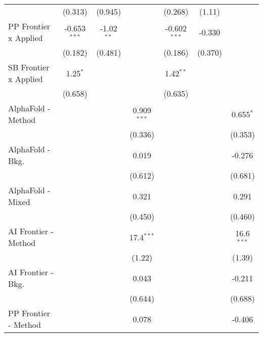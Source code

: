 \begin{tabular}{lcccccc}
                                  & (0.313)        & (0.945)       &               & (0.268)        & (1.11)        &   \\   
   PP Frontier x Applied          & -0.653$^{***}$ & -1.02$^{**}$  &               & -0.602$^{***}$ & -0.330        &   \\   
                                  & (0.182)        & (0.481)       &               & (0.186)        & (0.370)       &   \\   
   SB Frontier x Applied          & 1.25$^{*}$     &               &               & 1.42$^{**}$    &               &   \\   
                                  & (0.658)        &               &               & (0.635)        &               &   \\   
   AlphaFold - Method             &                &               & 0.909$^{***}$ &                &               & 0.655$^{*}$\\   
                                  &                &               & (0.336)       &                &               & (0.353)\\   
   AlphaFold - Bkg.               &                &               & 0.019         &                &               & -0.276\\   
                                  &                &               & (0.612)       &                &               & (0.681)\\   
   AlphaFold - Mixed              &                &               & 0.321         &                &               & 0.291\\   
                                  &                &               & (0.450)       &                &               & (0.460)\\   
   AI Frontier - Method           &                &               & 17.4$^{***}$  &                &               & 16.6$^{***}$\\   
                                  &                &               & (1.22)        &                &               & (1.39)\\   
   AI Frontier - Bkg.             &                &               & 0.043         &                &               & -0.211\\   
                                  &                &               & (0.644)       &                &               & (0.688)\\   
   PP Frontier - Method           &                &               & 0.078         &                &               & -0.406\\   

\end{tabular}
